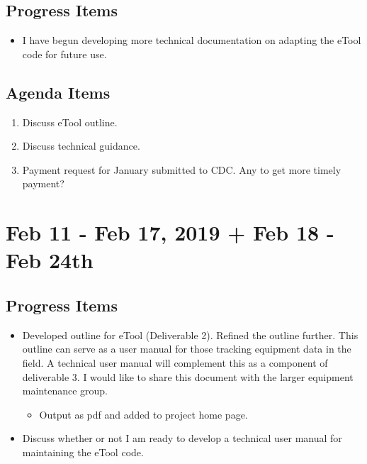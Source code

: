 \documentclass[]{article}
\providecommand{\tightlist}{%
  \setlength{\itemsep}{0pt}\setlength{\parskip}{0pt}}
\begin{document}
\hypertarget{progress-items-5}{%
\subsection{Progress Items}\label{progress-items-5}}

\begin{itemize}
\tightlist
\item
  I have begun developing more technical documentation on adapting the
  eTool code for future use.
\end{itemize}

\hypertarget{agenda-items-5}{%
\subsection{Agenda Items}\label{agenda-items-5}}

\begin{enumerate}
\def\labelenumi{\arabic{enumi}.}
\tightlist
\item
  Discuss eTool outline.
\item
  Discuss technical guidance.
\item
  Payment request for January submitted to CDC. Any to get more timely
  payment?
\end{enumerate}

\hypertarget{feb-11---feb-17-2019-feb-18---feb-24th}{%
\section{Feb 11 - Feb 17, 2019 + Feb 18 - Feb
24th}\label{feb-11---feb-17-2019-feb-18---feb-24th}}

\hypertarget{progress-items-6}{%
\subsection{Progress Items}\label{progress-items-6}}

\begin{itemize}
\tightlist
\item
  Developed outline for eTool (Deliverable 2). Refined the outline
  further. This outline can serve as a user manual for those tracking
  equipment data in the field. A technical user manual will complement
  this as a component of deliverable 3. I would like to share this
  document with the larger equipment maintenance group.

  \begin{itemize}
  \tightlist
  \item
    Output as pdf and added to project home page.
  \end{itemize}
\item
  Discuss whether or not I am ready to develop a technical user manual
  for maintaining the eTool code.
\end{itemize}
\end{document}
